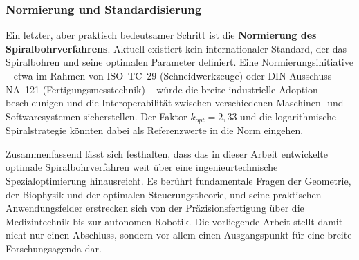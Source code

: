 ﻿\documentclass[12pt,a4paper]{article}
\begin{document}
\subsubsection{Normierung und Standardisierung}

Ein letzter, aber praktisch bedeutsamer Schritt ist die \textbf{Normierung des Spiralbohrverfahrens}. Aktuell existiert kein internationaler Standard, der das Spiralbohren und seine optimalen Parameter definiert. Eine Normierungsinitiative -- etwa im Rahmen von ISO~TC~29 (Schneidwerkzeuge) oder DIN-Ausschuss NA~121 (Fertigungsmesstechnik) -- würde die breite industrielle Adoption beschleunigen und die Interoperabilität zwischen verschiedenen Maschinen- und Softwaresystemen sicherstellen. Der Faktor $k_{opt} = 2{,}33$ und die logarithmische Spiralstrategie könnten dabei als Referenzwerte in die Norm eingehen.

\bigskip

Zusammenfassend lässt sich festhalten, dass das in dieser Arbeit entwickelte optimale Spiralbohrverfahren weit über eine ingenieurtechnische Spezialoptimierung hinausreicht. Es berührt fundamentale Fragen der Geometrie, der Biophysik und der optimalen Steuerungstheorie, und seine praktischen Anwendungsfelder erstrecken sich von der Präzisionsfertigung über die Medizintechnik bis zur autonomen Robotik. Die vorliegende Arbeit stellt damit nicht nur einen Abschluss, sondern vor allem einen Ausgangspunkt für eine breite Forschungsagenda dar.
\end{document}
